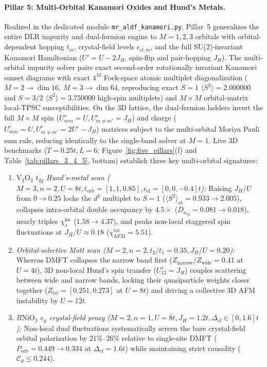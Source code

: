 \documentclass[11pt,a4paper]{article}
\numberwithin{equation}{section}
\theoremstyle{plain}
\theoremstyle{definition}
\begin{document}
\paragraph{Pillar 5: Multi-Orbital Kanamori Oxides and Hund's Metals.}
Realized in the dedicated module \texttt{mr\_aldf\_kanamori.py}, Pillar~5 generalizes the entire DLR impurity and dual-fermion engine to $M = 1, 2, 3$ orbitals with orbital-dependent hopping $t_m$, crystal-field levels $\epsilon_{\mathrm{cf},m}$, and the full SU(2)-invariant Kanamori Hamiltonian ($U' = U - 2J_H$, spin-flip and pair-hopping $J_H$). The multi-orbital impurity solver pairs exact second-order rotationally invariant Kanamori sunset diagrams with exact $4^M$ Fock-space atomic multiplet diagonalization ($M = 2 \to \dim 16$, $M = 3 \to \dim 64$, reproducing exact $S=1$ $\langle S^2\rangle = 2.000000$ and $S=3/2$ $\langle S^2\rangle = 3.750000$ high-spin multiplets) and $M\times M$ orbital-matrix local-TPSC susceptibilities. On the 3D lattice, the dual-fermion ladders invert the full $M\times M$ spin ($U^s_{mm} = U, U^s_{m\neq m'} = J_H$) and charge ($U^c_{mm} = U, U^c_{m\neq m'} = 2U' - J_H$) matrices subject to the multi-orbital Moriya Pauli sum rule, reducing identically to the single-band solver at $M = 1$. Live 3D benchmarks ($T = 0.25t, L = 6$; Figure~\ref{fig:five_pillars}(f) and Table~\ref{tab:pillars_3_4_5}, bottom) establish three key multi-orbital signatures:
\begin{enumerate}
  \item \emph{$\mathrm{V}_2\mathrm{O}_3$ $t_{2g}$ Hund's-metal scan ($M=3, n=2, U=8t, t_{\mathrm{orb}}=[1,1,0.85], \epsilon_{\mathrm{cf}}=[0,0,-0.4]t$):} Raising $J_H/U$ from $0 \to 0.25$ locks the $d^2$ multiplet to $S=1$ ($\langle S^2\rangle_{\mathrm{at}} = 0.933 \to 2.005$), collapses intra-orbital double occupancy by $4.5\times$ ($D_{a_{1g}} = 0.081 \to 0.018$), nearly triples $\chi_s^{\mathrm{loc}}$ ($1.58 \to 4.37$), and peaks non-local staggered spin fluctuations at $J_H/U \approx 0.18$ ($\chi_{\mathrm{AFM}}^{\mathrm{tot}} = 5.51$).
  \item \emph{Orbital-selective Mott scan ($M=2, n=2, t_2/t_1=0.35, J_H/U=0.20$):} Whereas DMFT collapses the narrow band first ($Z_{\mathrm{narrow}}/Z_{\mathrm{wide}} = 0.41$ at $U = 4t$), 3D non-local Hund's spin transfer ($U^s_{12} = J_H$) couples scattering between wide and narrow bands, locking their quasiparticle weights closer together ($Z_{\mathrm{lat}} = [0.251, 0.273]$ at $U = 8t$) and driving a collective 3D AFM instability by $U = 12t$.
  \item \emph{$R\mathrm{NiO}_3$ $e_g$ crystal-field proxy ($M=2, n=1, U=8t, J_H=1.2t, \Delta_{\mathrm{cf}} \in [0, 1.6]t$):} Non-local dual fluctuations systematically screen the bare crystal-field orbital polarization by $21\%$--$26\%$ relative to single-site DMFT ($P_{\mathrm{orb}} = 0.449 \to 0.334$ at $\Delta_{\mathrm{cf}} = 1.6t$) while maintaining strict causality ($\mathcal{C}_0 \le 0.244$).
\end{enumerate}
\end{document}
